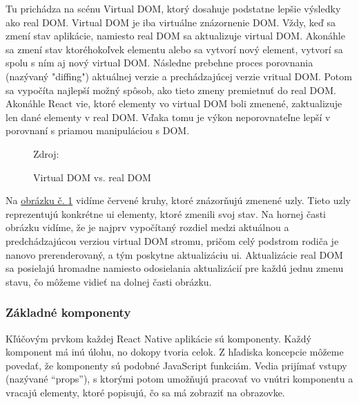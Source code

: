 Tu prichádza na scénu Virtual DOM, ktorý dosahuje podstatne lepšie výsledky ako real DOM. Virtual DOM je iba virtuálne znázornenie DOM. Vždy, keď sa zmení stav aplikácie, namiesto real DOM sa aktualizuje virtual DOM. Akonáhle sa zmení stav ktoréhokoľvek elementu alebo sa vytvorí nový element, vytvorí sa spolu s ním aj nový virtual DOM. Následne prebehne proces porovnania (nazývaný "diffing") aktuálnej verzie a prechádzajúcej verzie vritual DOM. Potom sa vypočíta najlepší možný spôsob, ako tieto zmeny premietnuť do real DOM. Akonáhle React vie, ktoré elementy vo virtual DOM boli zmenené, zaktualizuje len dané elementy v real DOM. Vďaka tomu je výkon neporovnateľne lepší v porovnaní s priamou manipuláciou s DOM. \cite{rn4}

\begin{figure}[!htbp]
  \centering  
  \def\stackalignment{c}
           {\scriptsize%
            Zdroj: \cite{oreily}}
	\caption{Virtual DOM vs. real DOM}  
  \label{domImg}
\end{figure}
Na \hyperref[domImg]{obrázku č. \ref{domImg}} vidíme červené kruhy, ktoré znázorňujú zmenené uzly. Tieto uzly reprezentujú konkrétne \acrshort{ui} elementy, ktoré zmenili svoj stav. Na hornej časti obrázku vidíme, že je najprv vypočítaný rozdiel medzi aktuálnou a predchádzajúcou verziou virtual DOM stromu, pričom celý podstrom rodiča je nanovo prerenderovaný, a tým poskytne aktualizáciu \acrshort{ui}. Aktualizácie real DOM sa posielajú hromadne namiesto odosielania aktualizácií pre každú jednu zmenu stavu, čo môžeme vidieť na dolnej časti obrázku. \\

\subsubsection{Základné komponenty}
Kľúčovým prvkom každej React Native aplikácie sú komponenty. Každý komponent má inú úlohu, no dokopy tvoria celok. Z hľadiska koncepcie môžeme povedať, že komponenty sú podobné JavaScript funkciám. Vedia prijímať vstupy (nazývané ``props''), s ktorými potom umožňujú pracovať vo vnútri komponentu a vracajú elementy, ktoré popisujú, čo sa má zobraziť na obrazovke. \cite{react}


